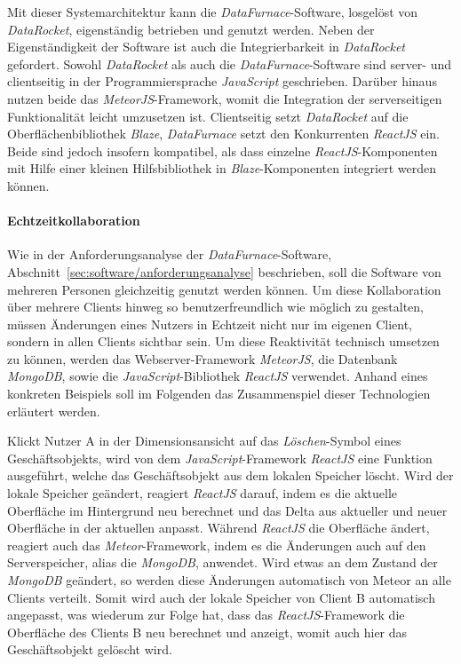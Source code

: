 \documentclass[
  language=german, %
  type=bachelor,%
  ngerman
]{isthesis}
\begin{document}
\begin{content}
  Mit dieser Systemarchitektur kann die \textit{DataFurnace}-Software, losgelöst
  von \textit{DataRocket}, eigenständig betrieben und genutzt werden. Neben der
  Eigenständigkeit der Software ist auch die Integrierbarkeit in
  \textit{DataRocket} gefordert. Sowohl \textit{DataRocket} als auch die
  \textit{DataFurnace}-Software sind server- und clientseitig in der
  Programmiersprache \textit{JavaScript} geschrieben. Darüber hinaus nutzen beide
  das \textit{MeteorJS}-Framework, womit die Integration der serverseitigen
  Funktionalität leicht umzusetzen ist. Clientseitig setzt \textit{DataRocket}
  auf die Oberflächenbibliothek \textit{Blaze}, \textit{DataFurnace} setzt den
  Konkurrenten \textit{ReactJS} ein. Beide sind jedoch insofern kompatibel, als
  dass einzelne \textit{ReactJS}-Komponenten mit Hilfe einer kleinen
  Hilfsbibliothek in \textit{Blaze}-Komponenten integriert werden können.




  \paragraph{Echtzeitkollaboration}

  Wie in der Anforderungsanalyse der \textit{DataFurnace}-Software,
  Abschnitt~\ref{sec:software/anforderungsanalyse} beschrieben, soll die
  Software von mehreren Personen gleichzeitig genutzt werden können. Um diese
  Kollaboration über mehrere Clients hinweg so benutzerfreundlich wie möglich
  zu gestalten, müssen Änderungen eines Nutzers in Echtzeit nicht nur im
  eigenen Client, sondern in allen Clients sichtbar sein. Um diese Reaktivität
  technisch umsetzen zu können, werden das Webserver-Framework \textit{MeteorJS},
  die Datenbank \textit{MongoDB}, sowie die \textit{JavaScript}-Bibliothek
  \textit{ReactJS} verwendet. Anhand eines konkreten Beispiels soll im
  Folgenden das Zusammenspiel dieser Technologien erläutert werden. 
  
  Klickt Nutzer A in der Dimensionsansicht auf das \textit{Löschen}-Symbol
  eines Geschäftsobjekts, wird von dem \textit{JavaScript}-Framework
  \textit{ReactJS} eine Funktion ausgeführt, welche das Geschäftsobjekt aus dem
  lokalen Speicher löscht. Wird der lokale Speicher geändert, reagiert
  \textit{ReactJS} darauf, indem es die aktuelle Oberfläche im Hintergrund neu
  berechnet und das Delta aus aktueller und neuer Oberfläche in der aktuellen
  anpasst. Während \textit{ReactJS} die Oberfläche ändert, reagiert auch das
  \textit{Meteor}-Framework, indem es die Änderungen auch auf den
  Serverspeicher, alias die \textit{MongoDB}, anwendet. Wird etwas an dem
  Zustand der \textit{MongoDB} geändert, so werden diese Änderungen automatisch
  von Meteor an alle Clients verteilt. Somit wird auch der lokale Speicher von
  Client B automatisch angepasst, was wiederum zur Folge hat, dass das
  \textit{ReactJS}-Framework die Oberfläche des Clients B neu berechnet und
  anzeigt, womit auch hier das Geschäftsobjekt gelöscht wird.


\end{content}
\end{document}
